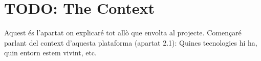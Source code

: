 
\section{TODO: The Context}

Aquest és l'apartat on explicaré tot allò que envolta al projecte. Començaré
parlant del context d'aquesta plataforma (apartat 2.1): Quines tecnologies hi
ha, quin entorn estem vivint, etc.
